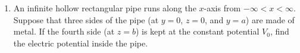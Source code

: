 \documentclass[fleqn]{article}
\begin{document}
\begin{enumerate}



    \item An infinite hollow rectangular pipe runs along the $x$-axis from $-\infty < x < \infty$. Suppose that three sides of the pipe 
    (at $y=0$, $z=0$, and $y=a$) are made of metal. If the fourth side (at $z=b$) is kept at the constant potential $V_0$, find the 
    electric potential inside the pipe.


\end{enumerate}
\end{document}

